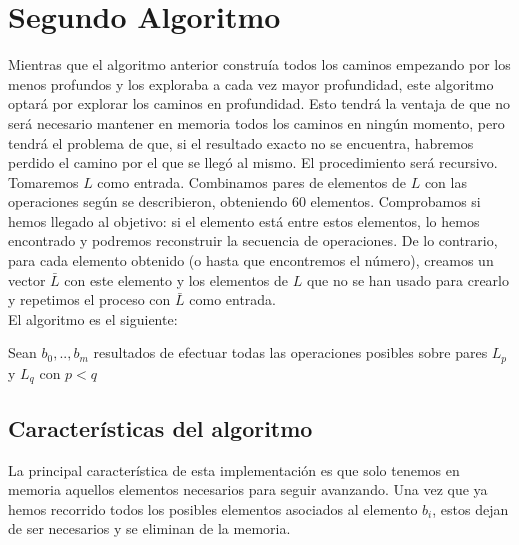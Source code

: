 \section{Segundo Algoritmo}
Mientras que el algoritmo anterior construía todos los caminos empezando por los
menos profundos y los exploraba a cada vez mayor profundidad, este algoritmo
optará por explorar los caminos en profundidad. Esto tendrá la ventaja de que no
será necesario mantener en memoria todos los caminos en ningún momento, pero
tendrá el problema de que, si el resultado exacto no se encuentra, habremos
perdido el camino por el que se llegó al mismo. El procedimiento será recursivo.\\

Tomaremos $L$ como entrada. Combinamos pares de elementos de $L$ con las operaciones
según se describieron, obteniendo 60 elementos. Comprobamos si hemos llegado al objetivo:
si el elemento está entre estos elementos, lo hemos encontrado y podremos
reconstruir la secuencia de operaciones. De lo contrario, para cada elemento
obtenido (o hasta que encontremos el número), creamos un vector $\bar L$ con este
elemento y los elementos de $L$ que no se han usado para crearlo y repetimos
el proceso con $\bar L$ como entrada. \\

El algoritmo es el siguiente:

\begin{algo}
 \hspace{0.25cm}	Sean $b_0,..,b_m$ resultados de efectuar todas las operaciones posibles sobre pares $L_p$ y $L_q$ con $p < q$ \;
\end{algo}

\subsection{Características del algoritmo}

La principal característica de esta implementación es que solo tenemos en memoria
aquellos elementos necesarios para seguir avanzando. Una vez que ya hemos
recorrido todos los posibles elementos asociados al elemento $b_i$,
estos dejan de ser necesarios y se eliminan de la memoria. \\

